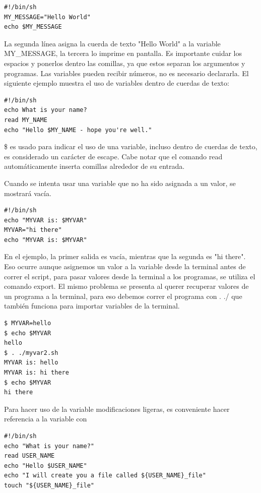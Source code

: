 \documentclass[a4paper]{article}
\begin{document}
\begin{verbatim}
#!/bin/sh
MY_MESSAGE="Hello World"
echo $MY_MESSAGE
\end{verbatim}

La segunda línea asigna la cuerda de texto "Hello World" a la variable MY\_MESSAGE, la tercera lo imprime en pantalla. Es importante cuidar los espacios y ponerlos dentro las comillas, ya que estos separan los argumentos y programas. Las variables pueden recibir números, no es necesario declararla. El siguiente ejemplo muestra el uso de variables dentro de cuerdas de texto:

\begin{verbatim}
#!/bin/sh
echo What is your name?
read MY_NAME
echo "Hello $MY_NAME - hope you're well."
\end{verbatim}

\$ es usado para indicar el uso de una variable, incluso dentro de cuerdas de texto, es considerado un carácter de escape. Cabe notar que el comando read automáticamente inserta comillas alrededor de su entrada.

Cuando se intenta usar una variable que no ha sido asignada a un valor, se mostrará vacía.

\begin{verbatim}
#!/bin/sh
echo "MYVAR is: $MYVAR"
MYVAR="hi there"
echo "MYVAR is: $MYVAR"
\end{verbatim}

En el ejemplo, la primer salida es vacía, mientras que la segunda es "hi there". Eso ocurre aunque asignemos un valor a la variable desde la terminal antes de correr el script, para pasar valores desde la terminal a los programas, se utiliza el comando export. El mismo problema se presenta al querer recuperar valores de un programa a la terminal, para eso debemos correr el programa con . ./ que también funciona para importar variables de la terminal.

\begin{verbatim}
$ MYVAR=hello
$ echo $MYVAR
hello
$ . ./myvar2.sh
MYVAR is: hello
MYVAR is: hi there
$ echo $MYVAR
hi there
\end{verbatim}

Para hacer uso de la variable modificaciones ligeras, es conveniente hacer referencia a la variable con {}

\begin{verbatim}
#!/bin/sh
echo "What is your name?"
read USER_NAME
echo "Hello $USER_NAME"
echo "I will create you a file called ${USER_NAME}_file"
touch "${USER_NAME}_file"
\end{verbatim}
\end{document}
